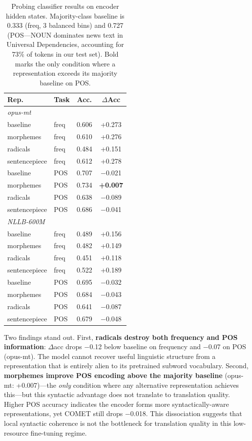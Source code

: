 \documentclass[11pt]{article}
\begin{document}
\begin{table}[t]
\centering
\small
\begin{tabular}{llcc}
\toprule
\textbf{Rep.} & \textbf{Task} & \textbf{Acc.} & \textbf{$\Delta$Acc} \\
\midrule
\multicolumn{4}{l}{\textit{opus-mt}} \\
baseline      & freq & 0.606 & +0.273 \\
morphemes     & freq & 0.610 & +0.276 \\
radicals      & freq & 0.484 & +0.151 \\
sentencepiece & freq & 0.612 & +0.278 \\
\midrule
baseline      & POS  & 0.707 & $-$0.021 \\
morphemes     & POS  & 0.734 & \textbf{+0.007} \\
radicals      & POS  & 0.638 & $-$0.089 \\
sentencepiece & POS  & 0.686 & $-$0.041 \\
\midrule
\multicolumn{4}{l}{\textit{NLLB-600M}} \\
baseline      & freq & 0.489 & +0.156 \\
morphemes     & freq & 0.482 & +0.149 \\
radicals      & freq & 0.451 & +0.118 \\
sentencepiece & freq & 0.522 & +0.189 \\
\midrule
baseline      & POS  & 0.695 & $-$0.032 \\
morphemes     & POS  & 0.684 & $-$0.043 \\
radicals      & POS  & 0.641 & $-$0.087 \\
sentencepiece & POS  & 0.679 & $-$0.048 \\
\bottomrule
\end{tabular}
\caption{Probing classifier results on encoder hidden states. Majority-class baseline is 0.333 (freq, 3 balanced bins) and 0.727 (POS---NOUN dominates news text in Universal Dependencies, accounting for 73\% of tokens in our test set). Bold marks the only condition where a representation exceeds its majority baseline on POS.}
\label{tab:probing}
\end{table}

Two findings stand out. First, \textbf{radicals destroy both frequency and POS information}: $\Delta$acc drops $-$0.12 below baseline on frequency and $-$0.07 on POS (opus-mt). The model cannot recover useful linguistic structure from a representation that is entirely alien to its pretrained subword vocabulary. Second, \textbf{morphemes improve POS encoding above the majority baseline} (opus-mt: +0.007)---the \textit{only} condition where any alternative representation achieves this---but this syntactic advantage does not translate to translation quality. Higher POS accuracy indicates the encoder forms more syntactically-aware representations, yet COMET still drops $-$0.018. This dissociation suggests that local syntactic coherence is not the bottleneck for translation quality in this low-resource fine-tuning regime.
\end{document}
